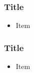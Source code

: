 \documentclass{beamer}\usepackage[]{graphicx}\usepackage[]{color}
\begin{document}
\begin{frame}
\frametitle{Title}
    \begin{itemize}
        \item Item
    \end{itemize}
\end{frame}

\begin{frame}
\frametitle{Title}
    \begin{itemize}
        \item Item
    \end{itemize}
\end{frame}
\end{document}
